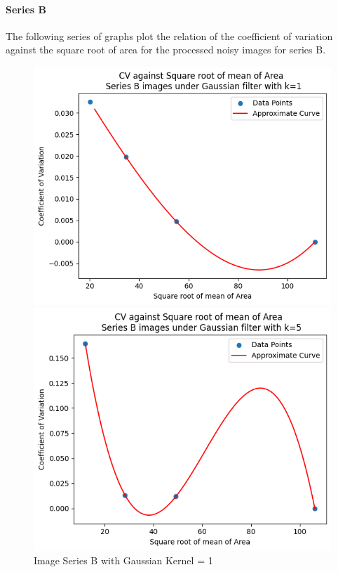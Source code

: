 \documentclass[runningheads]{llncs}
\begin{document}
\paragraph*{\textbf{Series B}}
\par The following series of graphs plot the relation of the coefficient of variation against the square root of area for the processed noisy images for series B. 
\begin{figure}[h!]
\begin{minipage}[h]{0.47\linewidth}
\begin{center}
\includegraphics[width=1\linewidth]{Report/Result_Images/series_B_Gaussian_kernel_1_area.png} 
\caption{Image Series B with Gaussian Kernel = 1}
\label{SeriesB-Gaussian-Kernel1-AreaGraph}
\end{center} 
\end{minipage}
\hfill
\vspace{0.2 cm}
\begin{minipage}[h]{0.47\linewidth}
\begin{center}
\includegraphics[width=1\linewidth]{Report/Result_Images/series_B_Gaussian_kernel_5_area.png} 

\end{center}
\end{minipage}
\end{figure}
\end{document}
